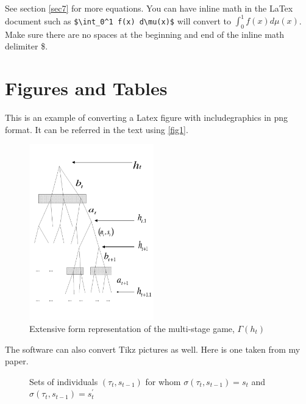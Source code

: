 \documentclass[12pt,svgnames]{article}
\begin{document}
See section \ref{sec7} for more equations.  You can have inline math in the LaTex document such as \verb&$\int_0^1 f(x) d\mu(x)$& will convert to $\int_0^1 f(x) d\mu(x)$. Make sure there are no spaces at the beginning and end of the inline math delimiter \$. 

\section{Figures and Tables} \label{sec5}

This is an example of converting a Latex figure with includegraphics in png format. It can be referred in the text using \autoref{fig1}.
 
\begin{figure}[htbp]
\begin{center}
\includegraphics[height=3.0in,keepaspectratio=true]{tree1.png}
\end{center}
\caption{Extensive form representation of the multi-stage game, $\Gamma(h_t)$}
\label{fig1}
\end{figure}

The software can also convert Tikz pictures as well.  Here is one taken from my \cite{Raut_2017a} paper.

\begin{figure}[tbp]
\begin{center}
\end{center}
\caption{Sets of individuals $(\tau_t,s_{t-1})$ for whom $\sigma(\tau_t,s_{t-1})=s_t$ and $\sigma(\tau _t,s_{t-1})=s^{\prime }_t$}
\label{fig2}
\end{figure}
\end{document}
